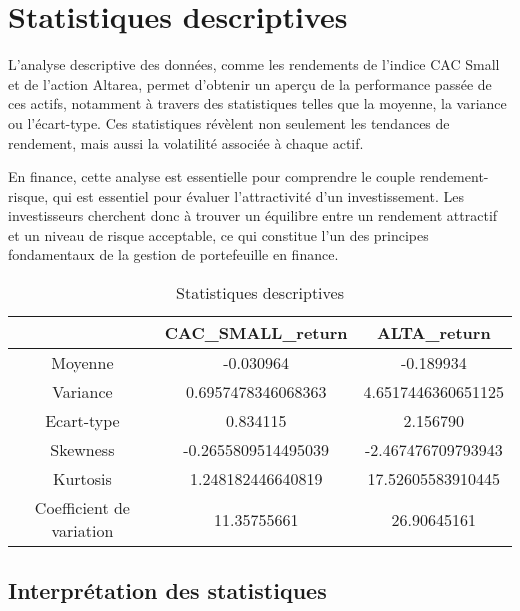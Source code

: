 \documentclass[a4paper, 12pt]{report}
\begin{document}
\section{Statistiques descriptives}
\noindent
L'analyse descriptive des données, comme les rendements de l'indice CAC Small et de l'action Altarea, permet d'obtenir un aperçu de la performance passée de ces actifs, notamment à travers des statistiques telles que la moyenne, la variance ou l'écart-type. Ces statistiques révèlent non seulement les tendances de rendement, mais aussi la volatilité associée à chaque actif.

En finance, cette analyse est essentielle pour comprendre le couple rendement-risque, qui est essentiel pour évaluer l'attractivité d'un investissement. Les investisseurs cherchent donc à trouver un équilibre entre un rendement attractif et un niveau de risque acceptable, ce qui constitue l'un des principes fondamentaux de la gestion de portefeuille en finance.

\begin{table}[H]
	\centering
	\begin{tabular}{@{}ccc@{}}
		\toprule
		& \multicolumn{1}{c}{CAC\_SMALL\_return} & \multicolumn{1}{c}{ALTA\_return} \\ \midrule
		Moyenne                  & -0.030964                              & -0.189934                        \\
		Variance                 & 0.6957478346068363                     & 4.6517446360651125               \\
		Ecart-type               & 0.834115                               & 2.156790                         \\
		Skewness                 & -0.2655809514495039                    & -2.467476709793943               \\
		Kurtosis                 & 1.248182446640819                      & 17.52605583910445                \\
		Coefficient de variation & 11.35755661                            & 26.90645161                      \\ \bottomrule
	\end{tabular}
	\caption{Statistiques descriptives}
	\label{tab:my-table4}
\end{table}

\subsection{Interprétation des statistiques}
\end{document}
